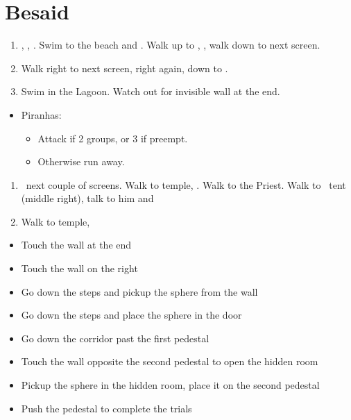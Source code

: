 \chapter{Besaid}

\begin{enumerate}
  \item \cs[0:30], \sd, \fmv. Swim to the beach and \sd. Walk up to \wakka, \sd, walk down to next screen.
  \item Walk right to next screen, right again, down to \wakka.
  \item Swim in the Lagoon. Watch out for invisible wall at the end.
\end{enumerate}
\begin{encounters}
  \begin{itemize}
    \item Piranhas:
          \begin{itemize}
            \item Attack if 2 groups, or 3 if preempt.
            \item Otherwise run away.
          \end{itemize}
  \end{itemize}
\end{encounters}
\begin{enumerate}[resume]
  \item \sd\ next couple of screens. Walk to temple, \cs. Walk to the Priest. Walk to \wakka\ tent (middle right), talk to him and \sd
  \item Walk to temple, \sd
\end{enumerate}
\begin{trial}
  \begin{itemize}
    \item Touch the wall at the end
    \item Touch the wall on the right
    \item Go down the steps and pickup the sphere from the wall
    \item Go down the steps and place the sphere in the door
    \item Go down the corridor past the first pedestal
    \item Touch the wall opposite the second pedestal to open the hidden room
    \item Pickup the sphere in the hidden room, place it on the second pedestal
    \item Push the pedestal to complete the trials
  \end{itemize}
\end{trial}

